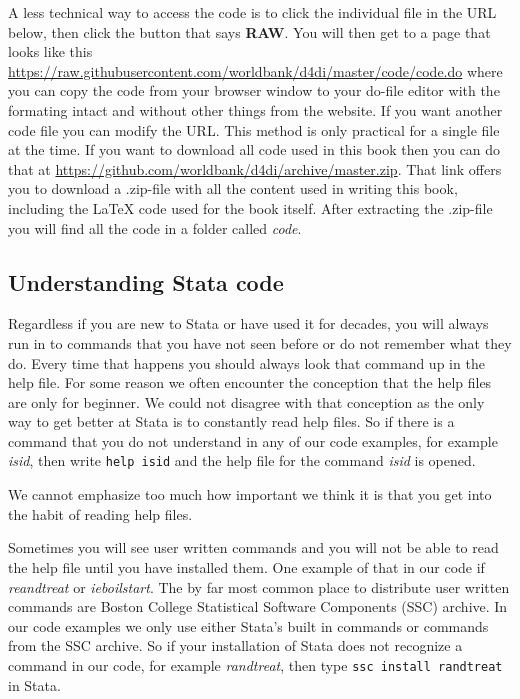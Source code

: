 A less technical way to access the code is to click the individual file in the URL below, then click
the button that says \textbf{RAW}. You will then get to a page that looks like this
\url{https://raw.githubusercontent.com/worldbank/d4di/master/code/code.do} where you can copy the code
from your browser window to your do-file editor with the formating intact and without other things from
the website. If you want another code file you can modify the URL. This method is only practical for a 
single file at the time. If you want to download all code used in this book then you can do that at
\url{https://github.com/worldbank/d4di/archive/master.zip}. That link offers you to download a .zip-file
with all the content used in writing this book, including the \LaTeX{} code used for the book itself. After 
extracting the .zip-file you will find all the code in a folder called \textit{code}. 

\subsection{Understanding Stata code}

Regardless if you are new to Stata or have used it for decades, you will always run in to commands that 
you have not seen before or do not remember what they do. Every time that happens you should always look 
that command up in the help file. For some reason we often encounter the conception that the help files 
are only for beginner. We could not disagree with that conception as the only way to get better at Stata 
is to constantly read help files. So if there is a command that you do not understand in any of our code 
examples, for example \textit{isid}, then write \verb+help isid+ and the help file for the 
command \textit{isid} is opened.

We cannot emphasize too much how important we think it is that you get into the habit of reading help files.

Sometimes you will see user written commands and you will not be able to read the help file until you have
installed them. One example of that in our code if \textit{reandtreat} or \textit{ieboilstart}. The by far
most common place to distribute user written commands are Boston College Statistical Software Components
(SSC) archive. In our code examples we only use either Stata's built in commands or commands from the 
SSC archive. So if your installation of Stata does not recognize a command in our code, for example 
\textit{randtreat}, then type \verb+ssc install randtreat+ in Stata. 

